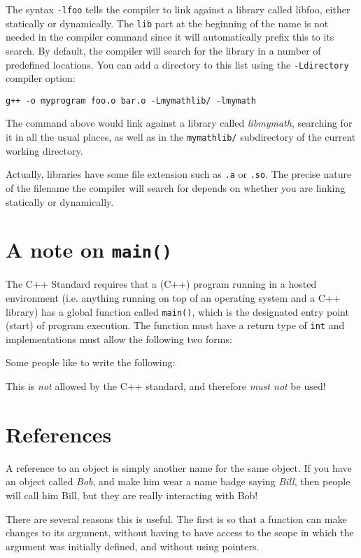 \documentclass[a4paper]{scrartcl}
\begin{document}
The syntax \verb|-lfoo| tells the compiler to link against a library called libfoo, either statically or dynamically. The \verb|lib| part at the beginning of the name is not needed in the compiler command since it will automatically prefix this to its search. By default, the compiler will search for the library in a number of predefined locations. You can add a directory to this list using the \verb|-Ldirectory| compiler option:

\begin{verbatim}
g++ -o myprogram foo.o bar.o -Lmymathlib/ -lmymath
\end{verbatim}

The command above would link against a library called \emph{libmymath}, searching for it in all the usual places, as well as in the \verb|mymathlib/| subdirectory of the current working directory.

Actually, libraries have some file extension such as \verb|.a| or \verb|.so|. The precise nature of the filename the compiler will search for depends on whether you are linking statically or dynamically.

\section{A note on \texttt{main()}}
The C++ Standard requires that a (C++) program running in a hosted environment (i.e. anything running on top of an operating system and a C++ library) has a global function called \verb|main()|, which is the designated entry point (start) of program execution. The function must have a return type of \verb|int| and implementations must allow the following two forms:



Some people like to write the following:



This is \emph{not} allowed by the C++ standard, and therefore \emph{must not} be used!

\section{References}
A reference to an object is simply another name for the same object. If you have an object called \emph{Bob}, and make him wear a name badge saying \emph{Bill}, then people will call him Bill, but they are really interacting with Bob!

There are several reasons this is useful. The first is so that a function can make changes to its argument, without having to have access to the scope in which the argument was initially defined, and without using pointers.
\end{document}
